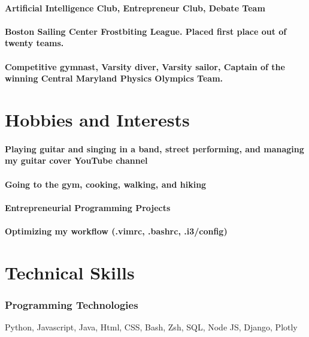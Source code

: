 \documentclass{article}
\begin{document}
\paragraph{Artificial Intelligence Club, Entrepreneur Club, Debate Team}
\paragraph{Boston Sailing Center Frostbiting League. Placed first place out of twenty teams.}
\paragraph{Competitive gymnast, Varsity diver, Varsity sailor, Captain of the winning Central Maryland Physics Olympics Team.}

\section{Hobbies and Interests}

\paragraph{Playing guitar and singing in a band, street performing, and managing my guitar cover YouTube channel}

\paragraph{Going to the gym, cooking, walking, and hiking}

\paragraph{Entrepreneurial Programming Projects}

\paragraph{Optimizing my workflow (.vimrc, .bashrc, .i3/config)}


\section{Technical Skills}

\subsubsection{Programming Technologies}
\hfill Python, Javascript, Java, Html, CSS, Bash, Zsh, SQL, Node JS, Django, Plotly

\end{document}
